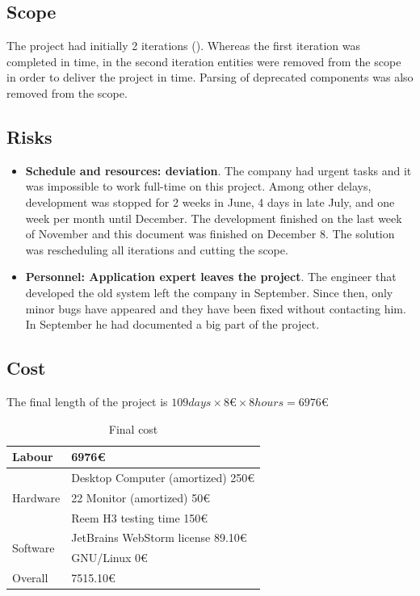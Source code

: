 \subsection*{Scope}
The project had initially 2 iterations ().
Whereas the first iteration was completed in time, in the second iteration entities were removed from the scope in order to deliver the project in time.
Parsing of deprecated components was also removed from the scope.

\subsection*{Risks}
\begin{itemize}
\item \textbf{Schedule and resources: deviation}. The company had urgent tasks and it was impossible to work full-time on this project. 
Among other delays, development was stopped for 2 weeks in June, 4 days in late July, and one week per month until December.
The development finished on the last week of November and this document was finished on December 8.
The solution was rescheduling all iterations and cutting the scope.
\item \textbf{Personnel: Application expert leaves the project}. The engineer that developed the old system left the company in September. Since then, only minor bugs have appeared and they have been fixed without contacting him. In September he had documented a big part of the project.
\end{itemize}

\subsection*{Cost}
The final length of the project is $109 days \times 8 \euro{} \times 8 hours = 6976 \euro{} $
\begin{table}[ht]
    \centering
    \begin{tabular}{| l | l |}
    \hline
    Labour & 6976\euro{} \\ \hline
    \multirow{3}{*}{Hardware} 
        & Desktop Computer (amortized) 250\euro{} \\ %
        & 22 Monitor (amortized) 50\euro{} \\
        & Reem H3 testing time 150\euro{} \\ \hline   
    \multirow{2}{*}{Software}
        & JetBrains WebStorm license 89.10\euro{} \\ %
        & GNU/Linux 0\euro{} \\ \hline
     Overall & 7515.10\euro{} \\ 
     \hline
    \end{tabular}
    \caption{Final cost}
    \label{tab:final-cost}
\end{table}